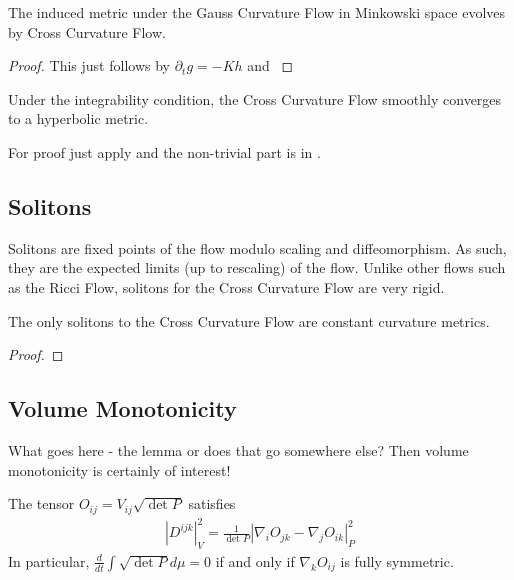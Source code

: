 \documentclass[a4paper, 12pt]{amsart}
\begin{document}
\begin{lemma}
\label{lem:xcf_gcf}

The induced metric under the Gauss Curvature Flow in Minkowski space evolves by Cross Curvature Flow.
\end{lemma}

\begin{proof}
{\color{red} This just follows by \(\partial_t g = -K h\) and }
\end{proof}

\begin{thm}
\label{thm:xcf_integrable_convergence}

Under the integrability condition, the Cross Curvature Flow smoothly converges to a hyperbolic metric.
\end{thm}

{\color{red}For proof just apply  and the non-trivial part is in \cite{MR3344442}.}

\subsection{Solitons}
\label{subsec:xcf_solitons}

Solitons are fixed points of the flow modulo scaling and diffeomorphism. As such, they are the expected limits (up to rescaling) of the flow. Unlike other flows such as the Ricci Flow, solitons for the Cross Curvature Flow are very rigid.

\begin{lemma}
The only solitons to the Cross Curvature Flow are constant curvature metrics.
\end{lemma}

\begin{proof}

\end{proof}

\subsection{Volume Monotonicity}
\label{subsec:xcf_volume}

{\color{red} What goes here - the lemma or does that go somewhere else? Then volume monotonicity is certainly of interest!}

\begin{lemma}
\label{codazzi}

The tensor $O_{ij}=V_{ij}\sqrt{\det P}$ satisfies
\begin{align}
|D^{ijk}|_V^2=\frac{1}{\det P}|\nabla_iO_{jk}-\nabla_jO_{ik}|_P^2
\end{align}
In particular, $\frac{d}{dt}\int \sqrt{\det P}d\mu=0$ if and only if $\nabla_k O_{ij}$ is fully symmetric.
\end{lemma}
\end{document}
